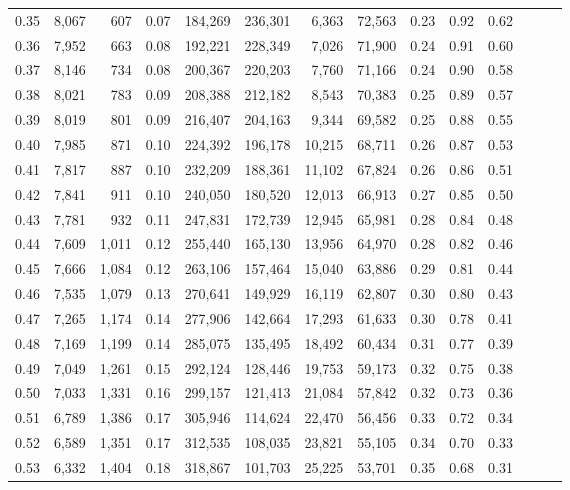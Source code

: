 \begin{tabular}{rrrrrrrrrrrrrr}
0.35 &  8,067 &    607 &  0.07 &  184,269 &  236,301 &   6,363 &  72,563 &  0.23 &  0.92 &      0.62 \\
0.36 &  7,952 &    663 &  0.08 &  192,221 &  228,349 &   7,026 &  71,900 &  0.24 &  0.91 &      0.60 \\
0.37 &  8,146 &    734 &  0.08 &  200,367 &  220,203 &   7,760 &  71,166 &  0.24 &  0.90 &      0.58 \\
0.38 &  8,021 &    783 &  0.09 &  208,388 &  212,182 &   8,543 &  70,383 &  0.25 &  0.89 &      0.57 \\
0.39 &  8,019 &    801 &  0.09 &  216,407 &  204,163 &   9,344 &  69,582 &  0.25 &  0.88 &      0.55 \\
0.40 &  7,985 &    871 &  0.10 &  224,392 &  196,178 &  10,215 &  68,711 &  0.26 &  0.87 &      0.53 \\
0.41 &  7,817 &    887 &  0.10 &  232,209 &  188,361 &  11,102 &  67,824 &  0.26 &  0.86 &      0.51 \\
0.42 &  7,841 &    911 &  0.10 &  240,050 &  180,520 &  12,013 &  66,913 &  0.27 &  0.85 &      0.50 \\
0.43 &  7,781 &    932 &  0.11 &  247,831 &  172,739 &  12,945 &  65,981 &  0.28 &  0.84 &      0.48 \\
0.44 &  7,609 &  1,011 &  0.12 &  255,440 &  165,130 &  13,956 &  64,970 &  0.28 &  0.82 &      0.46 \\
0.45 &  7,666 &  1,084 &  0.12 &  263,106 &  157,464 &  15,040 &  63,886 &  0.29 &  0.81 &      0.44 \\
0.46 &  7,535 &  1,079 &  0.13 &  270,641 &  149,929 &  16,119 &  62,807 &  0.30 &  0.80 &      0.43 \\
0.47 &  7,265 &  1,174 &  0.14 &  277,906 &  142,664 &  17,293 &  61,633 &  0.30 &  0.78 &      0.41 \\
0.48 &  7,169 &  1,199 &  0.14 &  285,075 &  135,495 &  18,492 &  60,434 &  0.31 &  0.77 &      0.39 \\
0.49 &  7,049 &  1,261 &  0.15 &  292,124 &  128,446 &  19,753 &  59,173 &  0.32 &  0.75 &      0.38 \\
0.50 &  7,033 &  1,331 &  0.16 &  299,157 &  121,413 &  21,084 &  57,842 &  0.32 &  0.73 &      0.36 \\
0.51 &  6,789 &  1,386 &  0.17 &  305,946 &  114,624 &  22,470 &  56,456 &  0.33 &  0.72 &      0.34 \\
0.52 &  6,589 &  1,351 &  0.17 &  312,535 &  108,035 &  23,821 &  55,105 &  0.34 &  0.70 &      0.33 \\
0.53 &  6,332 &  1,404 &  0.18 &  318,867 &  101,703 &  25,225 &  53,701 &  0.35 &  0.68 &      0.31 \\

\end{tabular}
